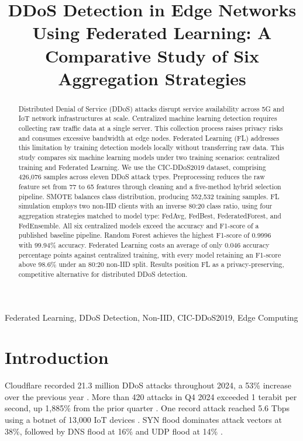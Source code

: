 \documentclass[conference, a4paper]{IEEEtran}
\begin{document}
\title{DDoS Detection in Edge Networks Using Federated Learning: A Comparative Study of Six Aggregation Strategies\\
}

\maketitle

\begin{abstract}
Distributed Denial of Service (DDoS) attacks disrupt service availability across 5G and IoT network infrastructures at scale. Centralized machine learning detection requires collecting raw traffic data at a single server. This collection process raises privacy risks and consumes excessive bandwidth at edge nodes. Federated Learning (FL) addresses this limitation by training detection models locally without transferring raw data. This study compares six machine learning models under two training scenarios: centralized training and Federated Learning. We use the CIC-DDoS2019 dataset, comprising 426,076 samples across eleven DDoS attack types. Preprocessing reduces the raw feature set from 77 to 65 features through cleaning and a five-method hybrid selection pipeline. SMOTE balances class distribution, producing 552,532 training samples. FL simulation employs two non-IID clients with an inverse 80:20 class ratio, using four aggregation strategies matched to model type: FedAvg, FedBest, FederatedForest, and FedEnsemble. All six centralized models exceed the accuracy and F1-score of a published baseline pipeline. Random Forest achieves the highest F1-score of 0.9996 with 99.94\% accuracy. Federated Learning costs an average of only 0.046 accuracy percentage points against centralized training, with every model retaining an F1-score above 98.6\% under an 80:20 non-IID split. Results position FL as a privacy-preserving, competitive alternative for distributed DDoS detection.
\end{abstract}

\begin{IEEEkeywords}
Federated Learning, DDoS Detection, Non-IID, CIC-DDoS2019, Edge Computing
\end{IEEEkeywords}

\section{Introduction}

Cloudflare recorded 21.3 million DDoS attacks throughout 2024, a 53\% increase over the previous year \cite{b1}. More than 420 attacks in Q4 2024 exceeded 1 terabit per second, up 1,885\% from the prior quarter \cite{b1}. One record attack reached 5.6 Tbps using a botnet of 13,000 IoT devices \cite{b1}. SYN flood dominates attack vectors at 38\%, followed by DNS flood at 16\% and UDP flood at 14\% \cite{b1}.
\end{document}
